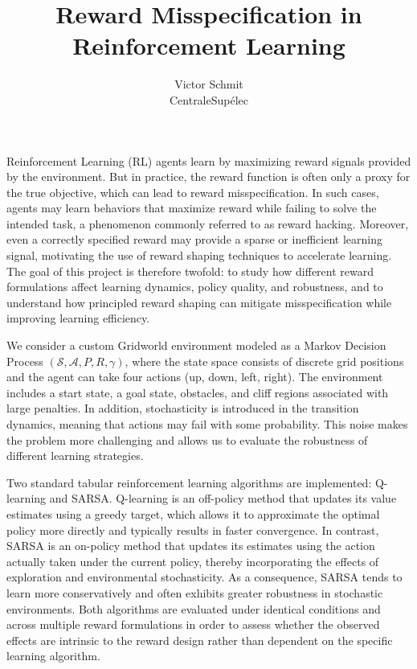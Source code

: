 \documentclass[10pt]{article}
\title{\textbf{Reward Misspecification in Reinforcement Learning}}
\author{Victor Schmit \\ CentraleSupélec}
\date{}
\begin{document}
\maketitle

Reinforcement Learning (RL) agents learn by maximizing reward signals provided by the environment. But in practice, the reward function is often only a proxy for the true objective, which can lead to reward misspecification. In such cases, agents may learn behaviors that maximize reward while failing to solve the intended task, a phenomenon commonly referred to as reward hacking. Moreover, even a correctly specified reward may provide a sparse or inefficient learning signal, motivating the use of reward shaping techniques to accelerate learning. The goal of this project is therefore twofold: to study how different reward formulations affect learning dynamics, policy quality, and robustness, and to understand how principled reward shaping can mitigate misspecification while improving learning efficiency.

\medskip

We consider a custom Gridworld environment modeled as a Markov Decision Process $(\mathcal{S}, \mathcal{A}, P, R, \gamma)$, where the state space consists of discrete grid positions and the agent can take four actions (up, down, left, right). The environment includes a start state, a goal state, obstacles, and cliff regions associated with large penalties. In addition, stochasticity is introduced in the transition dynamics, meaning that actions may fail with some probability. This noise makes the problem more challenging and allows us to evaluate the robustness of different learning strategies.

\medskip

Two standard tabular reinforcement learning algorithms are implemented: Q-learning and SARSA. Q-learning is an off-policy method that updates its value estimates using a greedy target, which allows it to approximate the optimal policy more directly and typically results in faster convergence. In contrast, SARSA is an on-policy method that updates its estimates using the action actually taken under the current policy, thereby incorporating the effects of exploration and environmental stochasticity. As a consequence, SARSA tends to learn more conservatively and often exhibits greater robustness in stochastic environments. Both algorithms are evaluated under identical conditions and across multiple reward formulations in order to assess whether the observed effects are intrinsic to the reward design rather than dependent on the specific learning algorithm.
\end{document}
